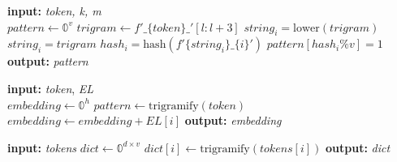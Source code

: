 \documentclass[11pt]{article}
\begin{document}
\begin{algorithm}[h]
\caption{trigramify}\label{alg:trigramify}\label{alg:mesa_algo}\label{alg:mesa_algo_decode}
\begin{algorithmic}
\State \textbf{input:} \emph{token, k, m} \\
 \vspace{4px}
\State $pattern \gets \mathbb{0}^{v}$
\State $trigram \gets f'\_\{token\}\_'[l:l+3]$
\State $string_i = \textrm{lower}(trigram)$
\Else
\State $string_i = trigram$
\EndIf
\State $hash_i = \textrm{hash}(f'\{string_i\}\_\{i\}')$
\State $pattern[hash_i\%v] = 1$
\EndFor\vspace{4px}
\EndFor\vspace{4px}
\State \textbf{output:} \emph{pattern}
\end{algorithmic}
\end{algorithm}





\begin{algorithm}[h]
\caption{encode}\label{alg:encode}
\begin{algorithmic}
\State \textbf{input:} \emph{token}, \emph{EL}\\
\vspace{4px}
\State $embedding \gets \mathbb{0}^{h}$
\State $pattern \gets \textrm{trigramify}(token)$
\State $embedding \gets embedding+EL[i]$
\EndIf
\EndFor
\State \textbf{output:} \emph{embedding}
\end{algorithmic}
\end{algorithm}


\begin{algorithm}[h]
\caption{compile\_dictionary}\label{alg:dict}
\begin{algorithmic}
\State \textbf{input:} \emph{tokens}\vspace{4px}
\State $dict \gets \mathbb{0}^{d\times v}$
\State $dict[i] \gets \textrm{trigramify}(tokens[i])$
\EndFor
\State \textbf{output:} \emph{dict}
\end{algorithmic}
\end{algorithm}
\end{document}
